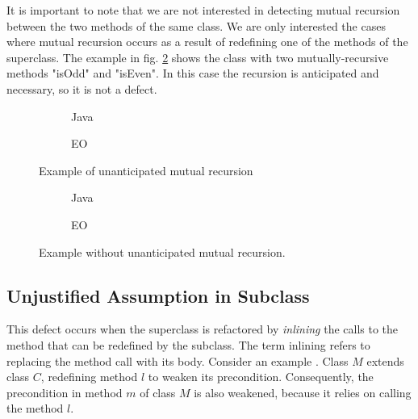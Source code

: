 It is important to note that we are not interested in detecting mutual recursion between the two methods of the same class. We are only interested the cases where mutual recursion occurs as a result of redefining one of the methods of the superclass. The example in fig. \ref{fig:oddeven} shows the class with two mutually-recursive methods "isOdd" and "isEven". In this case the recursion is anticipated and necessary, so it is not a defect.

\begin{figure}
    \centering
    \begin{subfigure}{0.4\textwidth}
        
        \caption{Java}
    \end{subfigure}
    \hfill
    \begin{subfigure}{0.4\textwidth}
        
        \caption{EO}
    \end{subfigure}
    \caption{Example of unanticipated mutual recursion}
    \label{fig:mutualrec_basic}
\end{figure}

\begin{figure}
    \centering
    \begin{subfigure}{0.4\textwidth}
        
        \caption{Java}
    \end{subfigure}
    \hfill
    \begin{subfigure}{0.4\textwidth}
        
        \caption{EO}
    \end{subfigure}
    \caption{Example without unanticipated mutual recursion.}
    \label{fig:oddeven}
\end{figure}

\subsection{Unjustified Assumption in Subclass}
This defect \cite[Section 3.3]{fragilebaseclass} occurs when the superclass is refactored by \textit{inlining} the calls to the method that can be redefined by the subclass. The term inlining refers to replacing the method call with its body. Consider an example . Class $M$ extends class $C$, redefining method $l$ to weaken its precondition. Consequently, the precondition in method $m$ of class $M$ is also weakened, because it relies on calling the method $l$.

